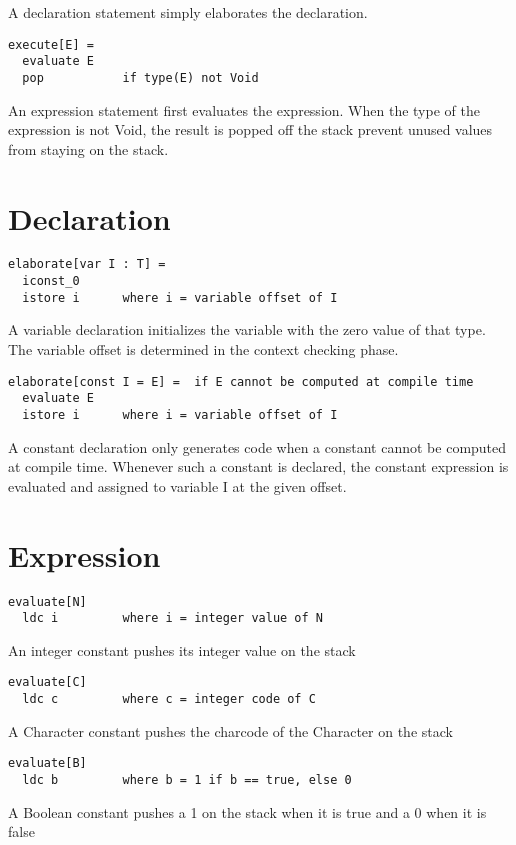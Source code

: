 A declaration statement simply elaborates the declaration.

\begin{lstlisting}
execute[E] = 
  evaluate E
  pop			if type(E) not Void
\end{lstlisting}

An expression statement first evaluates the expression. When the type of the expression is not Void, the result is popped off the stack prevent unused values from staying on the stack.
  
\section{Declaration}
\begin{lstlisting}
elaborate[var I : T] = 	
  iconst_0
  istore i		where i = variable offset of I
\end{lstlisting}

A variable declaration initializes the variable with the zero value of that type. The variable offset is determined in the context checking phase.

\begin{lstlisting}
elaborate[const I = E] =  if E cannot be computed at compile time
  evaluate E		
  istore i		where i = variable offset of I
\end{lstlisting}

A constant declaration only generates code when a constant cannot be computed at compile time. Whenever such a constant is declared, the constant expression is evaluated and assigned to variable I at the given offset.

\section{Expression}
\begin{lstlisting}
evaluate[N]
  ldc i			where i = integer value of N
\end{lstlisting}
An integer constant pushes its integer value on the stack

\begin{lstlisting}  
evaluate[C]
  ldc c			where c = integer code of C
\end{lstlisting}
A Character constant pushes the charcode of the Character on the stack

\begin{lstlisting}  
evaluate[B]
  ldc b			where b = 1 if b == true, else 0
\end{lstlisting}
A Boolean constant pushes a 1 on the stack when it is true and a 0 when it is false
  
